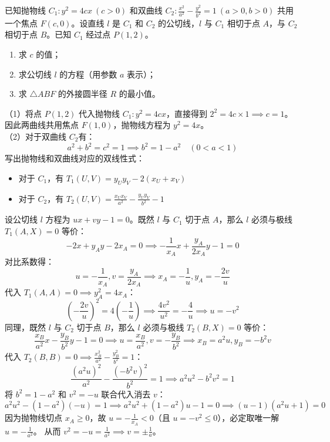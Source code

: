 \begin{exercise}[乐乐猴]
已知抛物线 $C_1: y^2 = 4cx\ (c > 0)$ 和双曲线 $C_2: \frac{x^2}{a^2} - \frac{y^2}{b^2} = 1\ (a > 0, b > 0)$ 共用一个焦点 $F(c, 0)$。设直线 $l$ 是 $C_1$ 和 $C_2$ 的公切线，$l$ 与 $C_1$ 相切于点 $A$，与 $C_2$ 相切于点 $B$。已知 $C_1$ 经过点 $P(1, 2)$。
\begin{enumerate}
    \item 求 $c$ 的值；
    \item 求公切线 $l$ 的方程（用参数 $a$ 表示）；
    \item 求 $\triangle ABF$ 的外接圆半径 $R$ 的最小值。
\end{enumerate}
\end{exercise}
\begin{solution}
（1）将点 $P(1,2)$ 代入抛物线 $C_1: y^2 = 4cx$，直接得到 $2^2 = 4c \times 1 \implies c = 1$。因此两曲线共用焦点 $F(1, 0)$，抛物线方程为 $y^2 = 4x$。\\
（2）对于双曲线 $C_2$有：
$$ a^2 + b^2 = c^2 = 1 \implies b^2 = 1 - a^2 \quad (0 < a < 1) $$
写出抛物线和双曲线对应的双线性式：
\begin{itemize}
    \item 对于 $C_1$，有 $T_1(U, V) = y_U y_V - 2(x_U + x_V)$
    \item 对于 $C_2$，有 $T_2(U, V) = \frac{x_U x_V}{a^2} - \frac{y_U y_V}{b^2} - 1$
\end{itemize}
设公切线 $l$ 方程为 $ux + vy - 1 = 0$。既然 $l$ 与 $C_1$ 切于点 $A$，那么 $l$ 必须与极线 $T_1(A, X) = 0$ 等价：
$$ -2x + y_A y - 2x_A = 0 \implies -\frac{1}{x_A}x + \frac{y_A}{2x_A}y - 1 = 0 $$
对比系数得：
\[u = -\frac{1}{x_A}, v = \frac{y_A}{2x_A}\implies x_A = -\frac{1}{u}, y_A = -\frac{2v}{u}\]
代入 $T_1(A,A) = 0 \implies y_A^2 = 4x_A$：
$$ \left(-\frac{2v}{u}\right)^2 = 4\left(-\frac{1}{u}\right) \implies \frac{4v^2}{u^2} = -\frac{4}{u} \implies u = -v^2 $$
同理，既然 $l$ 与 $C_2$ 切于点 $B$，那么 $l$ 必须与极线 $T_2(B, X) = 0$ 等价：
$$ \frac{x_B}{a^2}x - \frac{y_B}{b^2}y - 1 = 0 \implies u = \frac{x_B}{a^2}, v = -\frac{y_B}{b^2}\implies x_B = a^2 u, y_B = -b^2 v $$
代入 $T_2(B,B) = 0 \implies \frac{x_B^2}{a^2} - \frac{y_B^2}{b^2} = 1$：
$$ \frac{(a^2 u)^2}{a^2} - \frac{(-b^2 v)^2}{b^2} = 1 \implies a^2 u^2 - b^2 v^2 = 1$$
将 $b^2 = 1 - a^2$ 和 $v^2 = -u$ 联合代入消去 $v$：
$$ a^2 u^2 - (1-a^2)(-u) = 1 \implies a^2 u^2 + (1-a^2)u - 1 = 0 \implies (u - 1)(a^2 u + 1) = 0$$
因为抛物线切点 $x_A \ge 0$，故 $u = -\frac{1}{x_A} < 0$（且 $u = -v^2 \le 0$），必定取唯一解 $u = -\frac{1}{a^2}$。
从而 $v^2 = -u = \frac{1}{a^2} \implies v = \pm \frac{1}{a}$。

\end{solution}
